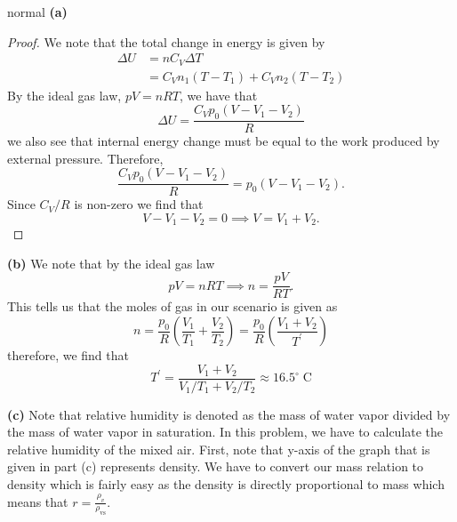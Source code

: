 \begin{solution}{normal}
\textbf{(a)} \begin{proof} We note that the total change in energy is given by
\begin{align*}
\Delta U &= n C_V\Delta T\\
&= C_Vn_1(T - T_1) + C_Vn_2(T - T_2)
\end{align*}By the ideal gas law, $pV = n RT$, we have that
\[\Delta U = \frac{C_Vp_0(V - V_1 - V_2)}{R}\]we also see that internal energy change must be equal to the work produced by external pressure. Therefore,
\[\frac{C_Vp_0(V - V_1 - V_2)}{R} = p_0 (V - V_1 - V_2).\]Since $C_V/R$ is non-zero we find that
\[V- V_1 - V_2 = 0\implies V = V_1 + V_2.\]
\end{proof}
\vspace{3mm}

\noindent \textbf{(b)} We note that by the ideal gas law
\[pV = n RT\implies n = \frac{pV}{RT}.\]This tells us that the moles of gas in our scenario is given as
\[n = \frac{p_0}{R}\left(\frac{V_1}{T_1} + \frac{V_2}{T_2}\right) = \frac{p_0}{R}\left(\frac{V_1 + V_2}{T^{\prime}}\right)\]therefore, we find that
\[T^{\prime} = \frac{V_1 + V_2}{V_1/T_1 + V_2/T_2}\approx \boxed{16.5^{\circ}\;\mathrm{C}}\]
\vspace{3mm}

\noindent \textbf{(c)} Note that relative humidity is denoted as the mass of water vapor divided by the mass of water vapor in saturation. In this problem, we have to calculate the relative humidity of the mixed air. First, note that y-axis of the graph that is given in part (c) represents density. We have to convert our mass relation to density which is fairly easy as the density is directly proportional to mass which means that $r = \frac{\rho_v}{\rho_{\text{vs}}}$.
\vspace{3mm}


\end{solution}
